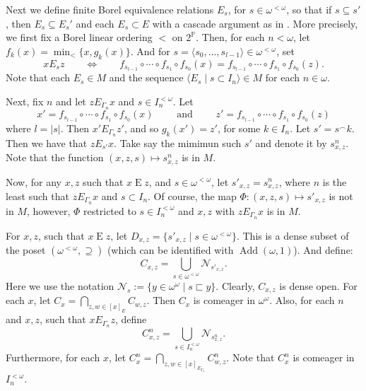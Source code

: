 \documentclass{amsart}
\newcommand{\cat}{^\frown}
\DeclareMathOperator{\Add}{Add}
\theoremstyle{definition}
\theoremstyle{remark}
\begin{document}
Next we define finite Borel equivalence relations \(E_s\), for \(s\in \omega^{<\omega}\), so that if $s\subseteq s'$, then $E_s\subseteq E_s'$ and each $E_s\subset E$ with a cascade argument as in \cite[Theorem~12.1]{KecMil}.
More precisely, we first fix a Borel linear ordering $<$ on $2^{\mathbb{P}}$. Then, for each $n<\omega$, let $f_k(x) = \min_{<}\{x, g_k(x)\}$. And for $s=\langle s_0, \dotsc, s_{l-1}\rangle\in\omega^{<\omega}$,  set
\[x \mathbin{E_s} z\qquad\iff\qquad f_{s_{l-1}}\circ \dotsb \circ f_{s_1} \circ f_{s_0}(x)=f_{s_{l-1}}\circ \dotsb \circ f_{s_1} \circ f_{s_0}(z).\]
Note that each $E_s\in M$ and the sequence $\langle E_s\mid s\subset I_n\rangle\in M$ for each $n\in \omega$.

Next, fix $n$ and let $z\mathbin{E_{\Gamma_n}} x$ and $s\in I_n^{<\omega}$. Let
\[x' = f_{s_{l-1}}\circ \dotsb \circ f_{s_1} \circ f_{s_0}(x)\qquad\text{ and }\qquad z' = f_{s_{l-1}}\circ \dotsb \circ f_{s_1} \circ f_{s_0}(z)\] where $l=|s|$. Then $x' \mathbin{E_{\Gamma_n}} z'$, and so  $g_k(x')=z'$, for some $k\in I_n$.  Let $s'=s\cat k$. Then we have that $z\mathbin{E_{s'}}x$. Take say the mimimun such $s'$ and denote it by $s^n_{x,z}$. Note that the function  $(x,z,s)\mapsto s^n_{x,z}$ is in \(M\). 



Now, for any $x,z$ such that $x\mathbin{E} z$, and $s\in \omega^{<\omega}$, let $s'_{x,z}=s^n_{x,z}$, where $n$ is the least such that $z\mathbin{E_{\Gamma_n}} x$ and $s\subset I_n$. Of course, the map  $\Phi\colon (x,z,s)\mapsto s'_{x,z}$ is not in $M$, however, $\Phi$ restricted to $s\in I_n^{<\omega}$ and $x,z$ with $z\mathbin{E_{\Gamma_n}} x$ is in $M$. 



For $x,z$, such that $x\mathbin{E}z$, let $D_{x,z}=\{s'_{x,z}\mid s\in \omega^{<\omega}\}$. This is a dense subset of the poset $(\omega^{<\omega}, \supseteq)$ (which can be identified with $\Add(\omega, 1)$). And define: $$C_{x,z}=\bigcup_{s\in \omega^{<\omega}}\mathcal{N}_{s'_{x,z}}.$$
Here we use the notation $\mathcal{N}_s:=\{y\in\omega^\omega\mid s\sqsubset y\}$. Clearly, $C_{x,z}$ is dense open. For each $x$, let $C_x = \bigcap_{z,w\in[x]_E}C_{w,z}$. Then $C_x$ is comeager in $\omega^\omega$. Also, for each $n$ and $x,z$, such that $xE_{\Gamma_n}z$, define $$C^n_{x,z}=\bigcup_{s\in I_n^{<\omega}}\mathcal{N}_{s^n_{x,z}}.$$
Furthermore, for each $x$, let $C^n_x = \bigcap_{z,w\in[x]_{E_{\Gamma_n}}}C^n_{w,z}$. Note that $C^n_x$ is comeager in $I_n^{<\omega}$.
\end{document}
